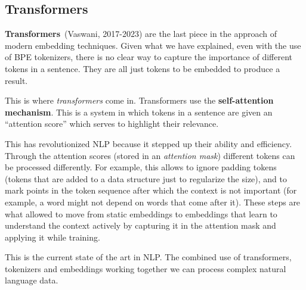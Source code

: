 \documentclass[a4paper, 11pt]{report}
\begin{document}
\subsection{Transformers}\label{Theory: Transformers}
\textbf{Transformers}~\cite{vaswani2023_Attention}(Vaswani, 2017-2023) are the last piece in the approach of modern embedding techniques. Given what we have explained, even with the use of BPE tokenizers, there is no clear way to capture the importance of different tokens in a sentence. They are all just tokens to be embedded to produce a result.

This is where \textit{transformers} come in. Transformers use the \textbf{self-attention mechanism}. This is a system in which tokens in a sentence are given an ``attention score'' which serves to highlight their relevance.

This has revolutionized NLP because it stepped up their ability and efficiency. Through the attention scores (stored in an \textit{attention mask}) different tokens can be processed differently. For example, this allows to ignore padding tokens (tokens that are added to a data structure just to regularize the size), and to mark points in the token sequence after which the context is not important (for example, a word might not depend on words that come after it). These steps are what allowed to move from static embeddings to embeddings that learn to understand the context actively by capturing it in the attention mask and applying it while training.

This is the current state of the art in NLP. The combined use of transformers, tokenizers and embeddings working together we can process complex natural language data.
\end{document}
